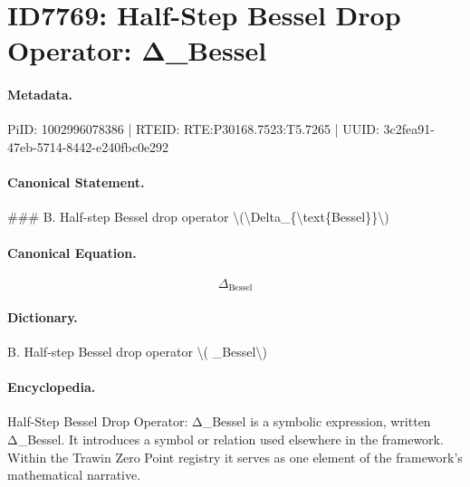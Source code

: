 \section*{ID7769: Half-Step Bessel Drop Operator: Δ\_Bessel}
\paragraph{Metadata.}
PiID: 1002996078386 | RTEID: RTE:P30168.7523:T5.7265 | UUID: 3c2fea91-47eb-5714-8442-e240fbc0e292

\paragraph{Canonical Statement.}
\#\#\# B. Half-step Bessel drop operator \textbackslash{}(\textbackslash{}Delta\_\{\textbackslash{}text\{Bessel\}\}\textbackslash{})

\paragraph{Canonical Equation.}
\[
\Delta_{\text{Bessel}}
\]

\paragraph{Dictionary.}
B. Half-step Bessel drop operator \textbackslash{}( \_Bessel\textbackslash{})

\paragraph{Encyclopedia.}
Half-Step Bessel Drop Operator: Δ\_Bessel is a symbolic expression, written Δ\_Bessel. It introduces a symbol or relation used elsewhere in the framework. Within the Trawin Zero Point registry it serves as one element of the framework's mathematical narrative.
